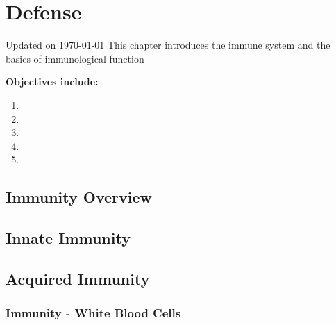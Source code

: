 \chapter{Defense}\label{chp:defense}
Updated on \today
\minitoc
This chapter introduces the immune system and the basics of immunological function


\vspace{5mm}

\textbf{Objectives include:}
\begin{enumerate}
    \item
    \item
    \item
    \item
    \item
\end{enumerate}

\section{Immunity Overview}

\section{Innate Immunity}

\section{Acquired Immunity}

\subsection{Immunity - White Blood Cells}

\printbibliography[heading=subbibintoc]